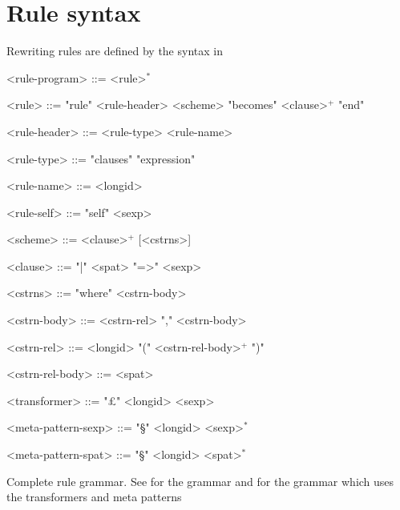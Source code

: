 \section{Rule syntax}

Rewriting rules are defined by the syntax in 

\begin{nonfloatingtable}

  \setlength{\grammarindent}{7.3em}
  \begin{grammar} 
    
    <rule-program> ::= <rule>$^{*}$
    
    <rule> ::= "rule" <rule-header> <scheme> "becomes" <clause>$^{+}$ "end"
    
    <rule-header> ::= <rule-type> <rule-name>
    
    <rule-type> ::= "clauses" 
    \alt "expression" 
    
    <rule-name> ::= <longid>
    
    <rule-self> ::= "self" <sexp>
    
    <scheme> ::= <clause>$^{+}$ [<cstrns>]
    
    <clause> ::= "|" <spat> "=>" <sexp>
    
    <cstrns> ::= "where" <cstrn-body> 
    
    <cstrn-body> ::= <cstrn-rel> 
     "," <cstrn-body>
    
    <cstrn-rel> ::= <longid> "(" <cstrn-rel-body>$^{+}$ ")"
    
    <cstrn-rel-body> ::= <spat>   
    
    <transformer> ::= "£" <longid> <sexp>

    <meta-pattern-sexp> ::= "§" <longid>  <sexp>$^{*}$
    
    <meta-pattern-spat> ::= "§" <longid>  <spat>$^{*}$

  \end{grammar}
  
  \caption{Complete rule grammar. See  for the
     grammar and  for the 
    grammar which uses the transformers and meta patterns}
  \label{tab:rule-grammar}

\end{nonfloatingtable}


